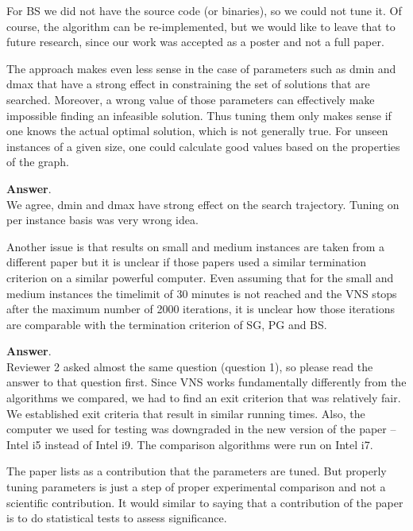 \documentclass [11pt]{scrartcl}
\begin{document}
For BS we did not have the source code (or binaries), so we could not tune it.
Of course, the algorithm can be re-implemented, but we would like to leave that to future research, since our work was accepted as a poster and not a full paper.

\begin{leftbar}
The approach makes even less sense in the case of parameters such as dmin and dmax that have a strong effect in constraining the set of solutions that are searched. Moreover, a wrong value of those parameters can effectively make impossible finding an infeasible solution. Thus tuning them only makes sense if one knows the actual optimal solution, which is not generally true. For unseen instances of a given size, one could calculate good values based on the properties of the graph.	
\end{leftbar}

\textbf{Answer}. \\
We agree, dmin and dmax have strong effect on the search trajectory. 
Tuning on per instance basis was very wrong idea. 


\begin{leftbar}
Another issue is that results on small and medium instances are taken from a different paper but it is unclear if those papers used a similar termination criterion on a similar powerful computer. Even assuming that for the small and medium instances the timelimit of 30 minutes is not reached and the VNS stops after the maximum number of 2000 iterations, it is unclear how those iterations are comparable with the termination criterion of SG, PG and BS.
\end{leftbar}

\textbf{Answer}.\\
Reviewer 2 asked almost the same question (question 1), so please read the answer to that question first.
Since VNS works fundamentally differently from the algorithms we compared, we had to find an exit criterion that was relatively fair. We established exit criteria that result in similar running times. Also, the computer we used for testing was downgraded in the new version of the paper -- Intel i5 instead of Intel i9. The comparison algorithms were run on Intel i7.

\begin{leftbar}
The paper lists as a contribution that the parameters are tuned. But properly tuning parameters is just a step of proper experimental comparison and not a scientific contribution. It would similar to saying that a contribution of the paper is to do statistical tests to assess significance.
\end{leftbar}
\end{document}
